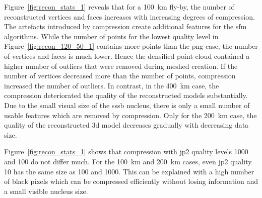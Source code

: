 Figure~\ref{fig:recon_stats_1} reveals that for a \SI{100}{\kilo\meter} fly-by, the number of reconstructed vertices and faces increases with increasing degrees of compression. The artefacts introduced by compression create additional features for the \gls{sfm} algorithms. While the number of points for the lowest quality level in Figure~\ref{fig:recon_120_50_1} contains more points than the \gls{png} case, the number of vertices and faces is much lower. Hence the densified point cloud contained a higher number of outliers that were removed during meshed creation. If the number of vertices decreased more than the number of points, compression increased the number of outliers. In contrast, in the \SI{400}{\kilo\meter} case, the compression deteriorated the quality of the reconstructed models substantially. Due to the small visual size of the \gls{sssb} nucleus, there is only a small number of usable features which are removed by compression. Only for the \SI{200}{\kilo\meter} case, the quality of the reconstructed \gls{3d} model decreases gradually with decreasing data size.

Figure~\ref{fig:recon_stats_1} shows that compression with \gls{jp2} quality levels 1000 and 100 do not differ much. For the \SI{100}{\kilo\meter} and \SI{200}{\kilo\meter} cases, even \gls{jp2} quality 10 has the same size as 100 and 1000. This can be explained with a high number of black pixels which can be compressed efficiently without losing information and a small visible nucleus size.

